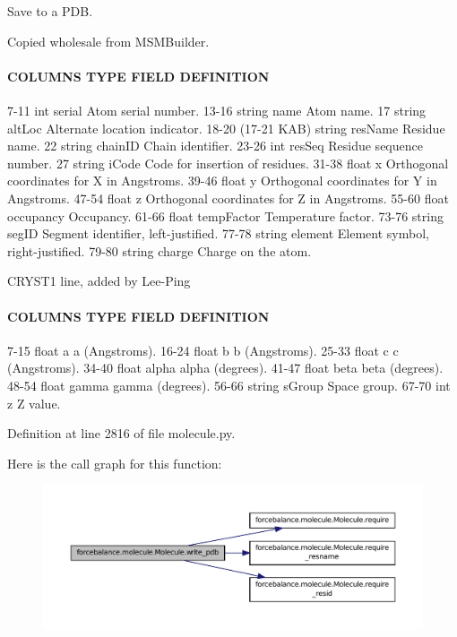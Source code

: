 Save to a P\-D\-B. 

Copied wholesale from M\-S\-M\-Builder. \paragraph*{C\-O\-L\-U\-M\-N\-S T\-Y\-P\-E F\-I\-E\-L\-D D\-E\-F\-I\-N\-I\-T\-I\-O\-N }

7-\/11 int serial Atom serial number. 13-\/16 string name Atom name. 17 string alt\-Loc Alternate location indicator. 18-\/20 (17-\/21 K\-A\-B) string res\-Name Residue name. 22 string chain\-I\-D Chain identifier. 23-\/26 int res\-Seq Residue sequence number. 27 string i\-Code Code for insertion of residues. 31-\/38 float x Orthogonal coordinates for X in Angstroms. 39-\/46 float y Orthogonal coordinates for Y in Angstroms. 47-\/54 float z Orthogonal coordinates for Z in Angstroms. 55-\/60 float occupancy Occupancy. 61-\/66 float temp\-Factor Temperature factor. 73-\/76 string seg\-I\-D Segment identifier, left-\/justified. 77-\/78 string element Element symbol, right-\/justified. 79-\/80 string charge Charge on the atom.

C\-R\-Y\-S\-T1 line, added by Lee-\/\-Ping \paragraph*{C\-O\-L\-U\-M\-N\-S T\-Y\-P\-E F\-I\-E\-L\-D D\-E\-F\-I\-N\-I\-T\-I\-O\-N }

7-\/15 float a a (Angstroms). 16-\/24 float b b (Angstroms). 25-\/33 float c c (Angstroms). 34-\/40 float alpha alpha (degrees). 41-\/47 float beta beta (degrees). 48-\/54 float gamma gamma (degrees). 56-\/66 string s\-Group Space group. 67-\/70 int z Z value. 

Definition at line 2816 of file molecule.\-py.



Here is the call graph for this function\-:
\nopagebreak
\begin{figure}[H]
\begin{center}
\leavevmode
\includegraphics[width=350pt]{classforcebalance_1_1molecule_1_1Molecule_a47082443566cd50add3f2ec20af9cc10_cgraph}
\end{center}
\end{figure}


